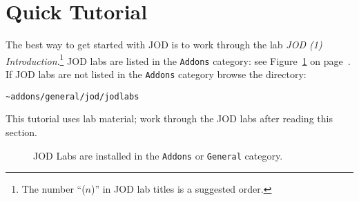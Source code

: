 \section{Quick Tutorial}

The best way to get started with JOD is to work through the
lab \emph{JOD (1) Introduction}.\footnote{The number 
``($n$)'' in JOD lab titles is a suggested order.}
JOD labs are listed in the \texttt{Addons} category: see 
Figure~\ref{eps:jodlabs} on page~\pageref{eps:jodlabs}. If
JOD labs are not listed in the \texttt{Addons} category browse 
the directory:
\begin{lstlisting}[frame=single,framerule=0pt]
~addons/general/jod/jodlabs
\end{lstlisting}
This tutorial uses lab material; work through the JOD labs after reading this section.



\begin{figure}[htbp]
  \centering
  \hfill
\caption[JOD Labs]{JOD Labs are installed in the \texttt{Addons} or \texttt{General} category.} 
  \label{eps:jodlabs}
\end{figure}


